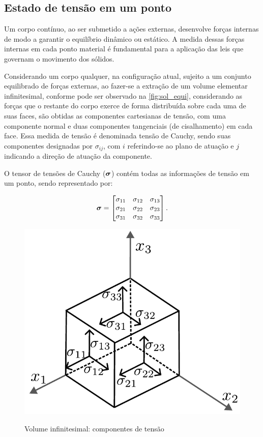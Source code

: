 \subsection{Estado de tensão em um ponto}

Um corpo contínuo, ao ser submetido a ações externas, desenvolve forças internas de modo a garantir o equilíbrio dinâmico ou estático. A medida dessas forças internas em cada ponto material é fundamental para a aplicação das leis que governam o movimento dos sólidos.

Considerando um corpo qualquer, na configuração atual, sujeito a um conjunto equilibrado de forças externas, ao fazer-se a extração de um volume elementar infinitesimal, conforme pode ser observado na \autoref{fig:sol_equi}, considerando as forças que o restante do corpo exerce de forma distribuída sobre cada uma de suas faces, são obtidas as componentes cartesianas de tensão, com uma componente normal e duas componentes tangenciais (de cisalhamento) em cada face. Essa medida de tensão é denominada tensão de Cauchy, sendo suas componentes designadas por $\sigma_{ij}$, com $i$ referindo-se ao plano de atuação e $j$ indicando a direção de atuação da componente.

O tensor de tensões de Cauchy ($\bm{\sigma}$) contém todas as informações de tensão em um ponto, sendo representado por:

\begin{align}
	\bm{\sigma} =
	\begin{bmatrix}
		\sigma_{11} & \sigma_{12} & \sigma_{13} \\
		\sigma_{21} & \sigma_{22} & \sigma_{23} \\
		\sigma_{31} & \sigma_{32} & \sigma_{33}
	\end{bmatrix}
	.
\end{align}


\begin{figure}[H]
	\caption{Volume infinitesimal: componentes de tensão}
	\centering
	\includegraphics[scale=0.5,trim=0cm 0.0cm 0cm 0cm, clip=true]{Imagens/Cap4/sol_vol_equi.pdf}	
	\label{fig:sol_equi}
\end{figure}

